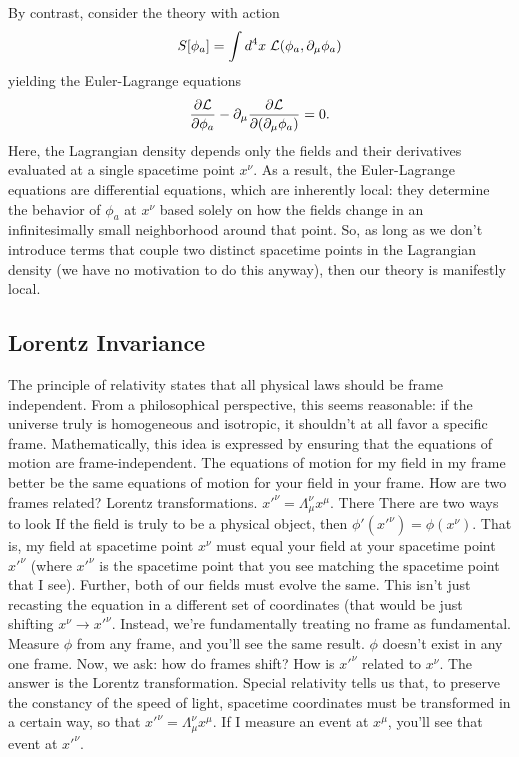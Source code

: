\noindent By contrast, consider the theory with action
\[
    S[\phi_a] = \int d^4x\; \mathcal{L}(\phi_a, \partial_\mu\phi_a)
\]
yielding the Euler-Lagrange equations
\[
    \frac{\partial\mathcal{L}}{\partial\phi_a} - \partial_\mu\frac{\partial\mathcal{L}}{\partial(\partial_\mu\phi_a)}=0.
\]
Here, the Lagrangian density depends only the fields and their derivatives evaluated at a single spacetime point $x^\nu$. As a result, the Euler-Lagrange equations are differential equations, which are inherently local: they determine the behavior of $\phi_a$ at $x^\nu$ based solely on how the fields change in an infinitesimally small neighborhood around that point. So, as long as we don't introduce terms that couple two distinct spacetime points in the Lagrangian density (we have no motivation to do this anyway), then our theory is manifestly local.
\subsection{Lorentz Invariance}
The principle of relativity states that all physical laws should be frame independent. From a philosophical perspective, this seems reasonable: if the universe truly is homogeneous and isotropic, it shouldn't at all favor a specific frame. Mathematically, this idea is expressed by ensuring that the equations of motion are frame-independent. The equations of motion for my field in my frame better be the same equations of motion for your field in your frame. How are two frames related? Lorentz transformations. $x'^\nu=\Lambda_\mu^\nu x^\mu$. There There are two ways to look If the field is truly to be a physical object, then $\phi'(x'^\nu)=\phi(x^\nu)$. That is, my field at spacetime point $x^\nu$ must equal your field at your spacetime point $x'^\nu$ (where $x'^\nu$ is the spacetime point that you see matching the spacetime point that I see). Further, both of our fields must evolve the same. This isn't just recasting the equation in a different set of coordinates (that would be just shifting $x^\nu\rightarrow x'^\nu$. Instead, we're fundamentally treating no frame as fundamental. Measure $\phi$ from any frame, and you'll see the same result. $\phi$ doesn't exist in any one frame. Now, we ask: how do frames shift? How is $x'^\nu$ related to $x^\nu$. The answer is the Lorentz transformation. Special relativity tells us that, to preserve the constancy of the speed of light, spacetime coordinates must be transformed in a certain way, so that $x'^\nu = \Lambda_\mu^\nu x^\mu$. If I measure an event at $x^\mu$, you'll see that event at $x'^\nu$.\\


